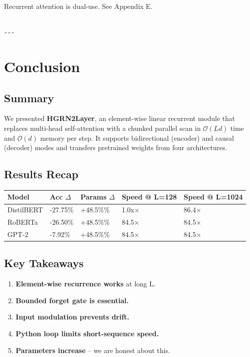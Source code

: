Recurrent attention is dual-use. See Appendix E.
\begin{lstlisting}

---
\end{lstlisting}

\section{Conclusion}

\subsection{Summary}

We presented \textbf{HGRN2Layer}, an element-wise linear recurrent module that 
replaces multi-head self-attention with a chunked parallel scan in 
$\mathcal{O}(L d)$ time and $\mathcal{O}(d)$ memory per step. It supports 
bidirectional (encoder) and causal (decoder) modes and transfers pretrained 
weights from four architectures.

\subsection{Results Recap}

\begin{table}[H]
\centering
\small
\begin{tabular}{lllll}
\toprule
\textbf{Model} & \textbf{Acc $\Delta$} & \textbf{Params $\Delta$} & \textbf{Speed @ L=128} & \textbf{Speed @ L=1024} \\
\midrule
DistilBERT & -27.75\% & +48.5\%\% & 1.0x$\times$ & 86.4$\times$ \\
RoBERTa & -26.50\% & +48.5\%\% & 84.5$\times$ & 84.5$\times$ \\
GPT-2 & -7.92\% & +48.5\%\% & 84.5$\times$ & 84.5$\times$ \\
\bottomrule
\end{tabular}
\end{table}

\subsection{Key Takeaways}

\begin{enumerate}
\item \textbf{Element-wise recurrence works} at long L.
\item \textbf{Bounded forget gate is essential.}
\item \textbf{Input modulation prevents drift.}
\item \textbf{Python loop limits short-sequence speed.}
\item \textbf{Parameters increase} -- we are honest about this.

\end{enumerate}

